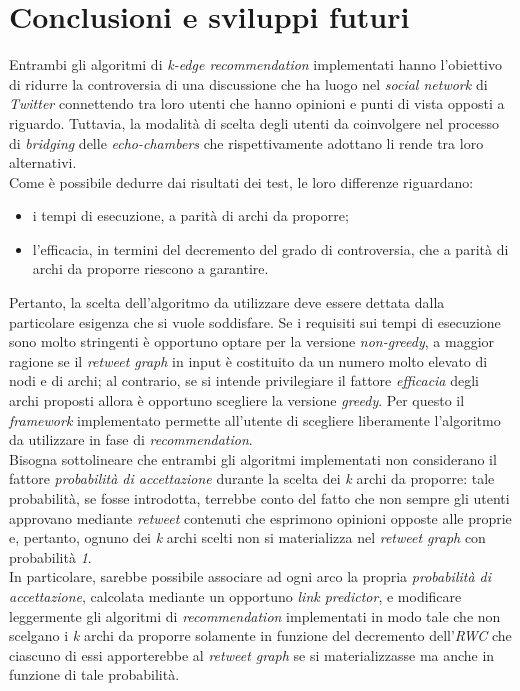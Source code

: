 \chapter{Conclusioni e sviluppi futuri}
\label{chap:conclusioni}
Entrambi gli algoritmi di \textit{k-edge recommendation} implementati hanno l'obiettivo di ridurre la controversia di una discussione che ha luogo nel \textit{social network} di \textit{Twitter} connettendo tra loro utenti che hanno opinioni e punti di vista opposti a riguardo. Tuttavia, la modalità di scelta degli utenti da coinvolgere nel processo di \textit{bridging} delle \textit{echo-chambers} che rispettivamente adottano li rende tra loro alternativi. 
\\Come è possibile dedurre dai risultati dei test, le loro differenze riguardano:
\begin{itemize}
\item i tempi di esecuzione, a parità di archi da proporre;
\item l'efficacia, in termini del decremento del grado di controversia, che a parità di archi da proporre riescono a garantire. 
\end{itemize}
Pertanto, la scelta dell'algoritmo da utilizzare deve essere dettata dalla particolare esigenza che si vuole soddisfare. Se i requisiti sui tempi di esecuzione sono molto stringenti è opportuno optare per la versione \textit{non-greedy}, a maggior ragione se il \textit{retweet graph} in input è costituito da un numero molto elevato di nodi e di archi; al contrario, se si intende privilegiare il fattore \textit{efficacia} degli archi proposti allora è opportuno scegliere la versione \textit{greedy}. Per questo il \textit{framework} implementato permette all'utente di scegliere liberamente l'algoritmo da utilizzare in fase di \textit{recommendation}.
\\Bisogna sottolineare che entrambi gli algoritmi implementati non considerano il fattore \textit{probabilità di accettazione} durante la scelta dei \textit{k} archi da proporre: tale probabilità, se fosse introdotta, terrebbe conto del fatto che non sempre gli utenti approvano mediante \textit{retweet} contenuti che esprimono opinioni opposte alle proprie e, pertanto, ognuno dei \textit{k} archi scelti non si materializza nel \textit{retweet graph} con probabilità \textit{1}. 
\\In particolare, sarebbe possibile associare ad ogni arco la propria \textit{probabilità di accettazione}, calcolata mediante un opportuno \textit{link predictor}, e modificare leggermente gli algoritmi di \textit{recommendation} implementati in modo tale che non scelgano i \textit{k} archi da proporre solamente in funzione del decremento dell'\textit{RWC} che ciascuno di essi apporterebbe al \textit{retweet graph} se si materializzasse ma anche in funzione di tale probabilità. 
